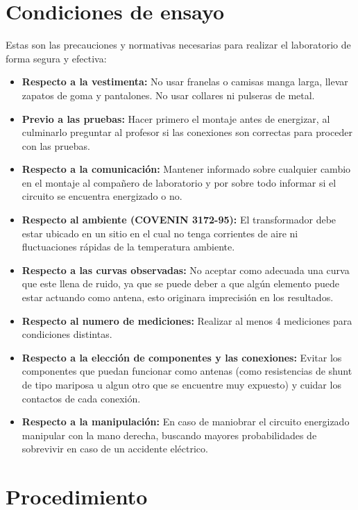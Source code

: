 \documentclass[11pt,letterpaper]{article}     %
\begin{document}
\section{Condiciones de ensayo}
Estas son las precauciones y normativas necesarias para realizar el laboratorio de forma segura y efectiva: 
\begin{itemize}
    \item \textbf{Respecto a la  vestimenta:} No usar franelas o camisas manga larga, llevar zapatos de goma y pantalones. No usar collares ni pulseras de metal.
    \item \textbf{Previo a las pruebas:} Hacer primero el montaje antes de energizar, al culminarlo preguntar al profesor si las conexiones son correctas para proceder con las pruebas.
    \item \textbf{Respecto a la comunicación:} Mantener informado sobre cualquier cambio en el montaje al compañero de laboratorio y por sobre todo informar si el circuito se encuentra energizado o no.
    \item \textbf{Respecto al ambiente (COVENIN 3172-95):} El transformador debe estar ubicado en un sitio en el cual no tenga corrientes de aire ni fluctuaciones rápidas de la temperatura ambiente.
	\item \textbf{Respecto a las curvas observadas:} No aceptar como adecuada una curva que este llena de ruido, ya que se puede deber a que algún elemento puede estar actuando como antena, esto originara imprecisión en los resultados.
	\item \textbf{Respecto al numero de mediciones:}
	Realizar al menos 4 mediciones para condiciones distintas.
	\item \textbf{Respecto a la elección de componentes y las conexiones:} Evitar los componentes que puedan funcionar como antenas (como resistencias de shunt de tipo mariposa u algun otro que se encuentre muy expuesto) y cuidar los contactos de cada conexión.
    \item \textbf{Respecto a la manipulación:} En caso de maniobrar el circuito energizado manipular con la mano derecha, buscando mayores probabilidades de sobrevivir en caso de un accidente eléctrico.
\end{itemize}
\section{Procedimiento}
\end{document}
